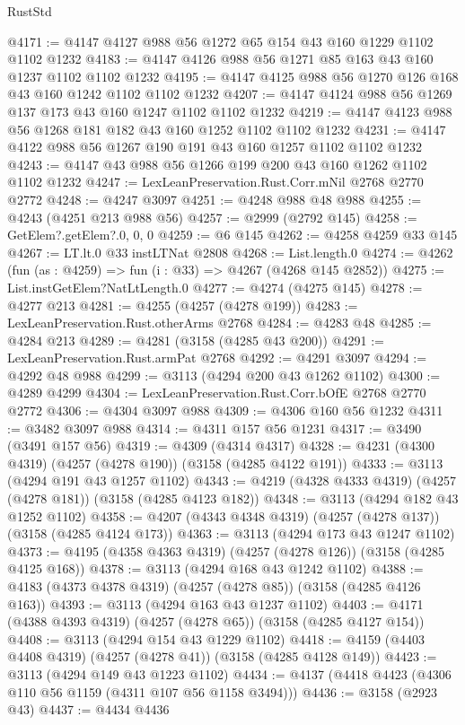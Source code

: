\begin{lexlean}{RustStd}
\begin{coremodule}
@4171 := @4147 @4127 @988 @56 @1272 @65 @154 @43 @160 @1229 @1102 @1102 @1232
@4183 := @4147 @4126 @988 @56 @1271 @85 @163 @43 @160 @1237 @1102 @1102 @1232
@4195 := @4147 @4125 @988 @56 @1270 @126 @168 @43 @160 @1242 @1102 @1102 @1232
@4207 := @4147 @4124 @988 @56 @1269 @137 @173 @43 @160 @1247 @1102 @1102 @1232
@4219 := @4147 @4123 @988 @56 @1268 @181 @182 @43 @160 @1252 @1102 @1102 @1232
@4231 := @4147 @4122 @988 @56 @1267 @190 @191 @43 @160 @1257 @1102 @1102 @1232
@4243 := @4147 @43 @988 @56 @1266 @199 @200 @43 @160 @1262 @1102 @1102 @1232
@4247 := LexLeanPreservation.Rust.Corr.mNil @2768 @2770 @2772
@4248 := @4247 @3097
@4251 := @4248 @988 @48 @988
@4255 := @4243 (@4251 @213 @988 @56)
@4257 := @2999 (@2792 @145)
@4258 := GetElem?.getElem?.{0, 0, 0}
@4259 := @6 @145
@4262 := @4258 @4259 @33 @145
@4267 := LT.lt.{0} @33 instLTNat @2808
@4268 := List.length.{0}
@4274 := @4262 (fun (as : @4259) => fun (i : @33) => @4267 (@4268 @145 @2852))
@4275 := List.instGetElem?NatLtLength.{0}
@4277 := @4274 (@4275 @145)
@4278 := @4277 @213
@4281 := @4255 (@4257 (@4278 @199))
@4283 := LexLeanPreservation.Rust.otherArms @2768
@4284 := @4283 @48
@4285 := @4284 @213
@4289 := @4281 (@3158 (@4285 @43 @200))
@4291 := LexLeanPreservation.Rust.armPat @2768
@4292 := @4291 @3097
@4294 := @4292 @48 @988
@4299 := @3113 (@4294 @200 @43 @1262 @1102)
@4300 := @4289 @4299
@4304 := LexLeanPreservation.Rust.Corr.bOfE @2768 @2770 @2772
@4306 := @4304 @3097 @988
@4309 := @4306 @160 @56 @1232
@4311 := @3482 @3097 @988
@4314 := @4311 @157 @56 @1231
@4317 := @3490 (@3491 @157 @56)
@4319 := @4309 (@4314 @4317)
@4328 := @4231 (@4300 @4319) (@4257 (@4278 @190)) (@3158 (@4285 @4122 @191))
@4333 := @3113 (@4294 @191 @43 @1257 @1102)
@4343 := @4219 (@4328 @4333 @4319) (@4257 (@4278 @181)) (@3158 (@4285 @4123 @182))
@4348 := @3113 (@4294 @182 @43 @1252 @1102)
@4358 := @4207 (@4343 @4348 @4319) (@4257 (@4278 @137)) (@3158 (@4285 @4124 @173))
@4363 := @3113 (@4294 @173 @43 @1247 @1102)
@4373 := @4195 (@4358 @4363 @4319) (@4257 (@4278 @126)) (@3158 (@4285 @4125 @168))
@4378 := @3113 (@4294 @168 @43 @1242 @1102)
@4388 := @4183 (@4373 @4378 @4319) (@4257 (@4278 @85)) (@3158 (@4285 @4126 @163))
@4393 := @3113 (@4294 @163 @43 @1237 @1102)
@4403 := @4171 (@4388 @4393 @4319) (@4257 (@4278 @65)) (@3158 (@4285 @4127 @154))
@4408 := @3113 (@4294 @154 @43 @1229 @1102)
@4418 := @4159 (@4403 @4408 @4319) (@4257 (@4278 @41)) (@3158 (@4285 @4128 @149))
@4423 := @3113 (@4294 @149 @43 @1223 @1102)
@4434 := @4137 (@4418 @4423 (@4306 @110 @56 @1159 (@4311 @107 @56 @1158 @3494)))
@4436 := @3158 (@2923 @43)
@4437 := @4434 @4436

\end{coremodule}
\end{lexlean}
